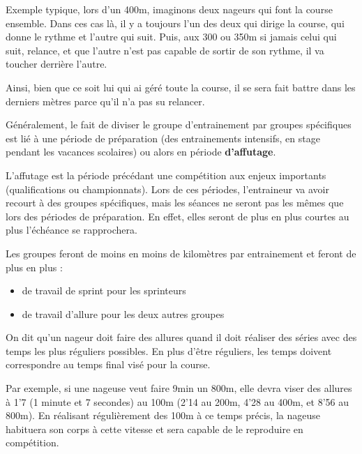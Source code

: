 \vspace{12pt}

Exemple typique, lors d'un 400m, imaginons deux nageurs qui font la course ensemble. Dans ces cas là, il y a toujours l'un des deux qui dirige la course, qui donne le rythme et l'autre qui suit. Puis, aux 300 ou 350m si jamais celui qui suit, relance, et que l'autre n'est pas capable de sortir de son rythme, il va toucher derrière l'autre. 

Ainsi, bien que ce soit lui qui ai géré toute la course, il se sera fait battre dans les derniers mètres parce qu'il n'a pas su relancer.

\vspace{12pt}

Généralement, le fait de diviser le groupe d'entrainement par groupes spécifiques est lié à une période de préparation (des entrainements intensifs, en stage pendant les vacances scolaires) ou alors en période \textbf{d'affutage}.

L'affutage est la période précédant une compétition aux enjeux importants (qualifications ou championnats). Lors de ces périodes, l'entraineur va avoir recourt à des groupes spécifiques, mais les séances ne seront pas les mêmes que lors des périodes de préparation. En effet, elles seront de plus en plus courtes au plus l'échéance se rapprochera.

Les groupes feront de moins en moins de kilomètres par entrainement et feront de plus en plus :
\begin{itemize}
\item de travail de sprint pour les sprinteurs
\item de travail d'allure pour les deux autres groupes
\end{itemize}

\vspace{12pt}

On dit qu'un nageur doit faire des allures quand il doit réaliser des séries avec des temps les plus réguliers possibles. En plus d'être réguliers, les temps doivent correspondre au temps final visé pour la course.

Par exemple, si une nageuse veut faire 9min un 800m, elle devra viser des allures à 1'7 (1 minute et 7 secondes) au 100m (2'14 au 200m, 4'28 au 400m, et 8'56 au 800m). En réalisant régulièrement des 100m à ce temps précis, la nageuse habituera son corps à cette vitesse et sera capable de le reproduire en compétition.

\vspace{12pt}

